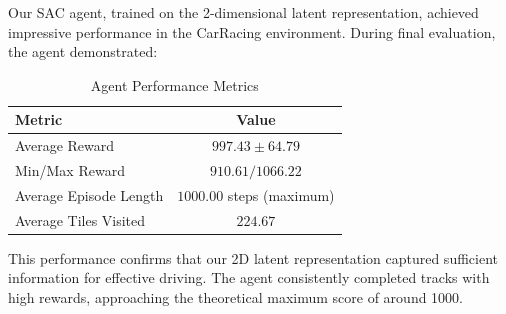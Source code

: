 \documentclass[conference]{IEEEtran}
\begin{document}
Our SAC agent, trained on the 2-dimensional latent representation, achieved impressive performance in the CarRacing environment. During final evaluation, the agent demonstrated:

\begin{table}[h]
\centering
\caption{Agent Performance Metrics}
\begin{tabular}{|l|c|}
\hline
\textbf{Metric} & \textbf{Value} \\
\hline
Average Reward & $997.43 \pm 64.79$ \\
\hline
Min/Max Reward & $910.61 / 1066.22$ \\
\hline
Average Episode Length & $1000.00$ steps (maximum) \\
\hline
Average Tiles Visited & $224.67$ \\
\hline
\end{tabular}
\label{tab:performance}
\end{table}

This performance confirms that our 2D latent representation captured sufficient information for effective driving. The agent consistently completed tracks with high rewards, approaching the theoretical maximum score of around 1000.
\end{document}
